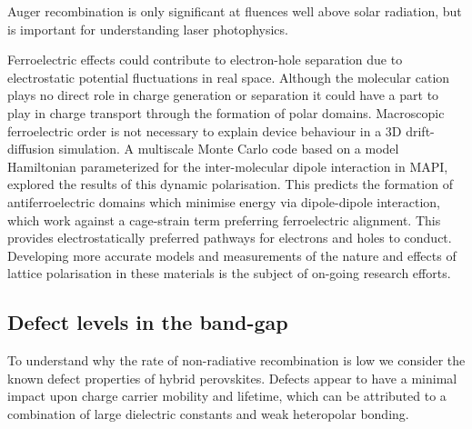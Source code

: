 Auger recombination is only significant at fluences well above solar radiation, but is important for understanding laser photophysics. 

Ferroelectric effects could contribute to electron-hole separation due to electrostatic potential fluctuations in real space.
Although the molecular cation plays no direct role in charge generation or separation it could have a part to play in charge transport through the formation of polar domains.\autocite{Frost2014b,Ma2014d}
Macroscopic ferroelectric order is not necessary to explain device behaviour in a 3D drift-diffusion simulation.\autocite{Sherkar2015}
A multiscale Monte Carlo code based on a model Hamiltonian parameterized for the inter-molecular dipole interaction in MAPI, explored the results of this dynamic polarisation.\autocite{Frost2014}
This predicts the formation of antiferroelectric domains which minimise energy via dipole-dipole interaction, which work against a cage-strain term preferring ferroelectric alignment.\autocite{Leguy2015b}
This provides electrostatically preferred pathways for electrons and holes to conduct.
Developing more accurate models and measurements of the nature and effects of lattice polarisation in these materials is the subject of on-going research efforts.


\subsection{Defect levels in the band-gap}\label{defects}

To understand why the rate of non-radiative recombination is low we consider the known defect properties of hybrid perovskites.
Defects appear to have a minimal impact upon charge carrier mobility and lifetime,\autocite{Brandt2015a}
which can be attributed to a combination of large dielectric constants and weak heteropolar bonding. 

